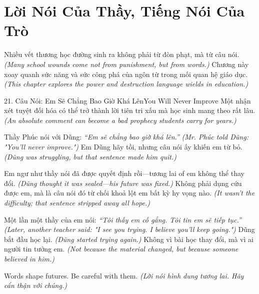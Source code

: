 \chapter{Lời Nói Của Thầy, Tiếng Nói Của Trò}

\begin{leadbox}
Nhiều vết thương học đường sinh ra không phải từ đòn phạt, mà từ câu nói.
\textit{(Many school wounds come not from punishment, but from words.)}
Chương này xoay quanh sức năng và sức công phá của ngôn từ trong mối quan hệ giáo dục.
\textit{(This chapter explores the power and destruction language wields in education.)}
\end{leadbox}

\begin{truyen}{21. Câu Nói: Em Sẽ Chẳng Bao Giờ Khá Lên}{You Will Never Improve}
Một nhận xét tuyệt đối hóa có thể trở thành lời tiên tri xấu mà học sinh mang theo rất lâu.
\textit{(An absolute comment can become a bad prophecy students carry for years.)}

Thầy Phúc nói với Dũng: \textit{``Em sẽ chẳng bao giờ khá lên.''}
\textit{(Mr. Phúc told Dũng: "You'll never improve.")}
Em Dũng hãy tồi, nhưng câu nói ấy khiến em từ bỏ.
\textit{(Dũng was struggling, but that sentence made him quit.)}

Em ngư như thầy nói đã được quyết định rồi—tương lai of em không thể thay đổi.
\textit{(Dũng thought it was sealed—his future was fixed.)}
Không phải dụng cứu được em, mà là câu nói đó từ chối khoả lột em bất kỳ hy vọng nào.
\textit{(It wasn't the difficulty; that sentence stripped away all hope.)}

Một lần một thầy của em nói: \textit{``Tôi thấy em cố gắng. Tôi tin em sẽ tiếp tục.''}
\textit{(Later, another teacher said: "I see you trying. I believe you'll keep going.")}
Dũng bắt đầu học lại.
\textit{(Dũng started trying again.)}
Không vì bài học thay đổi, mà vì ai người tin tưởng em.
\textit{(Not because the material changed, but because someone believed in him.)}
\end{truyen}

\begin{ghinhoanh}
Words shape futures. Be careful with them.
\textit{(Lời nói hình dung tương lai. Hãy cẩn thận với chúng.)}
\end{ghinhoanh}

